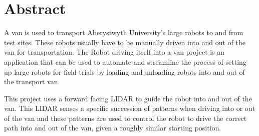 \thispagestyle{empty}


\section*{\centering Abstract}



A van is used to transport Aberystwyth University's large robots to and
from test sites. These robots usually have to be manually driven into
and out of the van for transportation. The Robot driving itself into a van
project is an application that can be used to automate and streamline the
process of setting up large robots for field trials by loading and unloading
robots into and out of the transport van.

This project uses a forward facing LIDAR to guide the robot into and out
of the van. This LIDAR senses a specific succession of patterns when
driving into or out of the van and these patterns are used to control the
robot to drive the correct path into and out of the van, given a roughly similar starting position.

